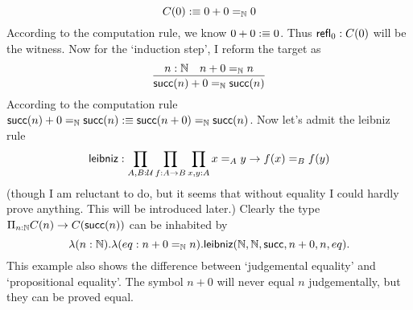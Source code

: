 $$
    C(0) :\equiv 0 + 0 =_{\mathbb{N}} 0
$$
According to the computation rule, we know $0 + 0:\equiv 0$. Thus
$\text{\sf refl}_0: C(0)$ will be the witness. Now for the `induction step',
I reform the target as
$$
\infer{\succn(n) + 0 =_\nat \succn(n)}{n:\nat & n+0=_\nat n}
$$
According to the computation rule 
$\text{\sf succ}(n) + 0 =_{\mathbb{N}} \text{\sf succ}(n):\equiv \text{\sf succ}(n+0)=_{\mathbb{N}}\text{\sf succ}(n)$. 
Now let's admit the leibniz rule 
$$
    \text{\sf leibniz}: \prod_{A,B:\mathcal{U}}\prod_{f:A\to B}\prod_{x,y:A}
        x=_Ay\to f(x)=_Bf(y)
$$ 
(though I am reluctant to do, but it seems that without equality I could
hardly prove anything. This will be introduced later.)
Clearly the type $\Pi_{n:\mathbb{N}}C(n)\to C(\text{\sf succ}(n))$ can be inhabited by
$$
    \lambda (n:\mathbb{N}).\lambda (eq:n+0=_{\mathbb{N}} n). \text{\sf leibniz}
    (\mathbb{N},\mathbb{N},\text{\sf succ},n+0,n,eq). 
$$
This example also shows the difference between `judgemental equality' 
and `propositional equality'. The symbol $n+0$ will never equal $n$
judgementally, but they can be proved equal. 

